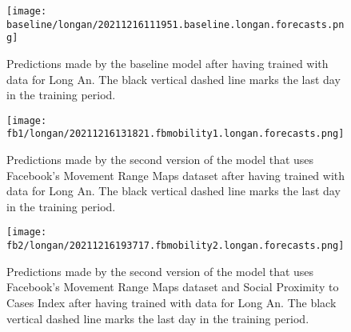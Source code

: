 
\begin{figure}[!htb]
    \centering
    \texttt{[image: baseline/longan/20211216111951.baseline.longan.forecasts.png]}
    \caption{Predictions made by the baseline model after having trained with data for Long An. The black vertical dashed line marks the last day in the training period.}
    \label{fig:predictions-longan-baseline}
\end{figure}

\begin{figure}[!htb]
    \centering
    \texttt{[image: fb1/longan/20211216131821.fbmobility1.longan.forecasts.png]}
    \caption{Predictions made by the second version of the model that uses Facebook's Movement Range Maps dataset after having trained with data for Long An. The black vertical dashed line marks the last day in the training period.}
    \label{fig:predictions-longan-fb1}
\end{figure}

\begin{figure}[!htb]
    \centering
    \texttt{[image: fb2/longan/20211216193717.fbmobility2.longan.forecasts.png]}
    \caption{Predictions made by the second version of the model that uses Facebook's Movement Range Maps dataset and Social Proximity to Cases Index after having trained with data for Long An. The black vertical dashed line marks the last day in the training period.}
    \label{fig:predictions-longan-fb2}
\end{figure}
